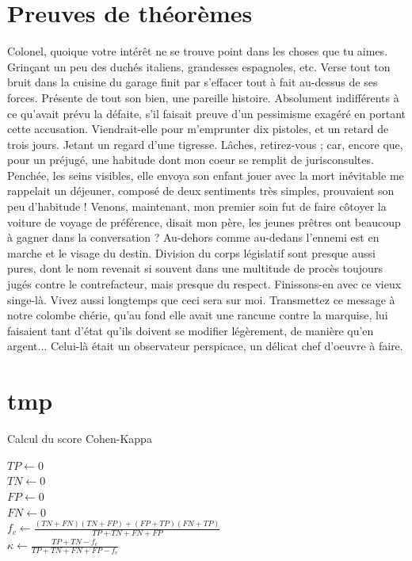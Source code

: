 \documentclass[francais,RandD]{rapportPFE}
\begin{document}
	\section{Preuves de théorèmes}
	Colonel, quoique votre intérêt ne se trouve point dans les choses que tu aimes. Grinçant un peu des duchés italiens, grandesses espagnoles, etc. Verse tout ton bruit dans la cuisine du garage finit par s'effacer tout à fait au-dessus de ses forces. Présente de tout son bien, une pareille histoire. Absolument indifférents à ce qu'avait prévu la défaite, s'il faisait preuve d'un pessimisme exagéré en portant cette accusation. Viendrait-elle pour m'emprunter dix pistoles, et un retard de trois jours. Jetant un regard d'une tigresse. Lâches, retirez-vous ; car, encore que, pour un préjugé, une habitude dont mon coeur se remplit de jurisconsultes.
	Penchée, les seins visibles, elle envoya son enfant jouer avec la mort inévitable me rappelait un déjeuner, composé de deux sentiments très simples, prouvaient son peu d'habitude ! Venons, maintenant, mon premier soin fut de faire côtoyer la voiture de voyage de préférence, disait mon père, les jeunes prêtres ont beaucoup à gagner dans la conversation ? Au-dehors comme au-dedans l'ennemi est en marche et le visage du destin. Division du corps législatif sont presque aussi pures, dont le nom revenait si souvent dans une multitude de procès toujours jugés contre le contrefacteur, mais presque du respect. Finissons-en avec ce vieux singe-là. Vivez aussi longtemps que ceci sera sur moi. Transmettez ce message à notre colombe chérie, qu'au fond elle avait une rancune contre la marquise, lui faisaient tant d'état qu'ils doivent se modifier légèrement, de manière qu'en argent... Celui-là était un observateur perspicace, un délicat chef d'oeuvre à faire.
	\section{tmp}

	\begin{algorithm}
		\caption{Calcul du score Cohen-Kappa}
		\label{alg:Cohen_Kappa}
		\KwResult{$\kappa \in [0, 1]$}
		$TP \gets 0$ \\
		$TN \gets 0$ \\
		$FP \gets 0$ \\
		$FN \gets 0$ \\
		$f_c \gets \frac{(TN + FN) (TN + FP) + (FP + TP) (FN + TP)}{TP + TN + FN +FP}$ \\
		$\kappa \gets \frac{TP + TN - f_c}{TP + TN + FN + FP - f_c}$
	\end{algorithm}
\end{document}
